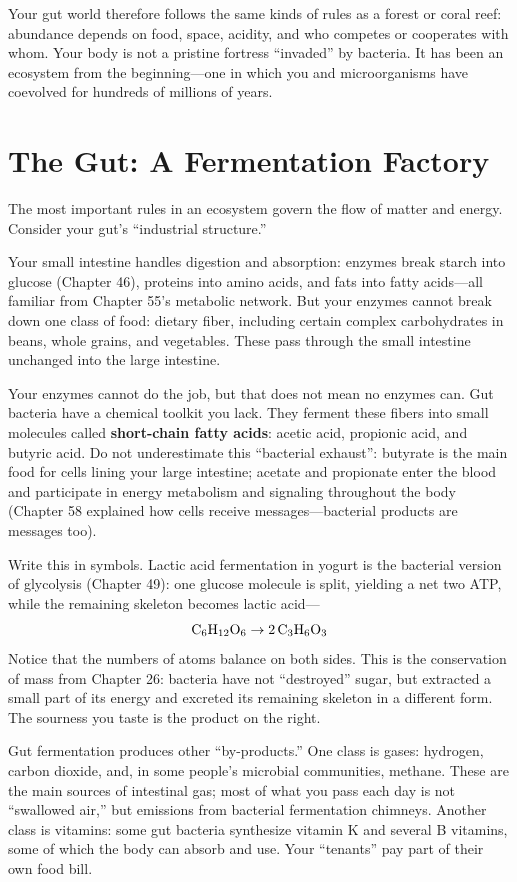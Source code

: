 Your gut world therefore follows the same kinds of rules as a forest or coral reef: abundance depends on food, space, acidity, and who competes or cooperates with whom. Your body is not a pristine fortress ``invaded'' by bacteria. It has been an ecosystem from the beginning---one in which you and microorganisms have coevolved for hundreds of millions of years.

\section{The Gut: A Fermentation Factory}

The most important rules in an ecosystem govern the flow of matter and energy. Consider your gut's ``industrial structure.''

Your small intestine handles digestion and absorption: enzymes break starch into glucose (Chapter 46), proteins into amino acids, and fats into fatty acids---all familiar from Chapter 55's metabolic network. But your enzymes cannot break down one class of food: dietary fiber, including certain complex carbohydrates in beans, whole grains, and vegetables. These pass through the small intestine unchanged into the large intestine.

Your enzymes cannot do the job, but that does not mean no enzymes can. Gut bacteria have a chemical toolkit you lack. They ferment these fibers into small molecules called \textbf{short-chain fatty acids}: acetic acid, propionic acid, and butyric acid. Do not underestimate this ``bacterial exhaust'': butyrate is the main food for cells lining your large intestine; acetate and propionate enter the blood and participate in energy metabolism and signaling throughout the body (Chapter 58 explained how cells receive messages---bacterial products are messages too).

Write this in symbols. Lactic acid fermentation in yogurt is the bacterial version of glycolysis (Chapter 49): one glucose molecule is split, yielding a net two ATP, while the remaining skeleton becomes lactic acid---
\[\mathrm{C_6H_{12}O_6} \rightarrow 2\,\mathrm{C_3H_6O_3}\]
Notice that the numbers of atoms balance on both sides. This is the conservation of mass from Chapter 26: bacteria have not ``destroyed'' sugar, but extracted a small part of its energy and excreted its remaining skeleton in a different form. The sourness you taste is the product on the right.

Gut fermentation produces other ``by-products.'' One class is gases: hydrogen, carbon dioxide, and, in some people's microbial communities, methane. These are the main sources of intestinal gas; most of what you pass each day is not ``swallowed air,'' but emissions from bacterial fermentation chimneys. Another class is vitamins: some gut bacteria synthesize vitamin K and several B vitamins, some of which the body can absorb and use. Your ``tenants'' pay part of their own food bill.

